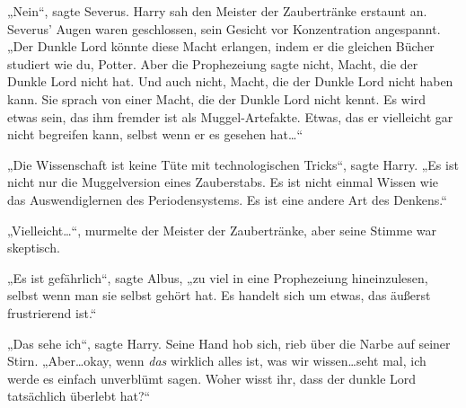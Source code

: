 

„Nein“, sagte Severus. Harry sah den Meister der Zaubertränke erstaunt an. Severus' Augen waren geschlossen, sein Gesicht vor Konzentration angespannt. „Der Dunkle Lord könnte diese Macht erlangen, indem er die gleichen Bücher studiert wie du, Potter. Aber die Prophezeiung sagte nicht, Macht, die der Dunkle Lord nicht hat. Und auch nicht, Macht, die der Dunkle Lord nicht haben kann. Sie sprach von einer Macht, die der Dunkle Lord nicht kennt. Es wird etwas sein, das ihm fremder ist als Muggel-Artefakte. Etwas, das er vielleicht gar nicht begreifen kann, selbst wenn er es gesehen hat…“

„Die Wissenschaft ist keine Tüte mit technologischen Tricks“, sagte Harry. „Es ist nicht nur die Muggelversion eines Zauberstabs. Es ist nicht einmal Wissen wie das Auswendiglernen des Periodensystems. Es ist eine andere Art des Denkens.“

„Vielleicht…“, murmelte der Meister der Zaubertränke, aber seine Stimme war skeptisch.

„Es ist gefährlich“, sagte Albus, „zu viel in eine Prophezeiung hineinzulesen, selbst wenn man sie selbst gehört hat. Es handelt sich um etwas, das äußerst frustrierend ist.“

„Das sehe ich“, sagte Harry. Seine Hand hob sich, rieb über die Narbe auf seiner Stirn. „Aber…okay, wenn \emph{das} wirklich alles ist, was wir wissen…seht mal, ich werde es einfach unverblümt sagen. Woher wisst ihr, dass der dunkle Lord tatsächlich überlebt hat?“


